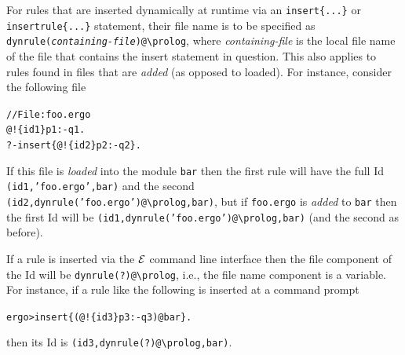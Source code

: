 \documentclass[11pt]{article}
\newcommand{\ERGO}{\mbox{\ensuremath{\cal{E}}\smaller{{\sc{RGO}}}}\xspace}
\newcommand{\FLSYSTEM}{\ERGO}
\newcommand{\prompt}{ergo> }
\newcommand{\ergoext}{ergo\xspace}
\newcommand{\bs}{\textbackslash}
\begin{document}
For rules that are inserted dynamically at runtime
via an \texttt{insert\{...\}} or
\texttt{insertrule\{...\}}  statement, their file name is to be specified
as \texttt{dynrule(\textnormal{\emph{containing-file}})@\bs{}prolog},
where \emph{containing-file} is the local file name of the
file that contains the insert statement in question.  This also applies to
rules found in files that are \emph{added} (as opposed to loaded). 
For instance, consider the following file
\begin{alltt}
   // File: foo.\ergoext
   @!\{id1\} p1 :- q1.
   ?- insert\{@!\{id2\} p2 :- q2\}.
\end{alltt}
If this file is \emph{loaded} into the module \texttt{bar} then the first
rule will have the full Id \texttt{(id1,'foo.\ergoext',bar)} and the second
\texttt{(id2,dynrule('foo.\ergoext')@\bs{}prolog,bar)}, but if
\texttt{foo.\ergoext} is \emph{added} to \texttt{bar} then the first Id will be
\texttt{(id1,dynrule('foo.\ergoext')@\bs{}prolog,bar)} (and the second as
before).

If a rule is inserted via the \FLSYSTEM command line interface then the
file component of the Id will be \texttt{dynrule(?)@\bs{}prolog}, i.e., the
file name component is a variable. For instance, if a rule like the
following is inserted at a command prompt
\begin{alltt}
   \prompt  insert\{(@!\{id3\} p3 :- q3)@bar\}.
\end{alltt}
then its Id is \texttt{(id3,dynrule(?)@\bs{}prolog,bar)}.
\end{document}
